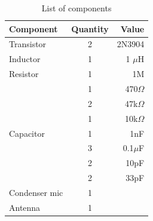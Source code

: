 \documentclass[journal,5pt,twocolumn]{IEEEtran}
\begin{document}
  
  \begin{table}[h]
\centering
\begin{tabular}{|l|c|r|}
\hline
\textbf{Component} & \textbf{Quantity} & \textbf{Value} \\ \hline
Transistor & 2 & 2N3904 \\ \hline
Inductor &1&1 $\mu$H \\ \hline
Resistor & 1 & 1M \\ 
& 1 & 470$\Omega$ \\ 
& 2 & 47k$\Omega$ \\ 
& 1 & 10k$\Omega$ \\ \hline
Capacitor & 1 & 1nF \\ 
& 3 & 0.1$\mu$F \\ 
& 2 & 10pF \\ 
& 2 & 33pF \\ \hline
Condenser mic & 1 & \\ \hline
Antenna & 1& \\ \hline
\end{tabular}
\caption{List of components}
\label{tab:components}
\end{table}
\end{document}
